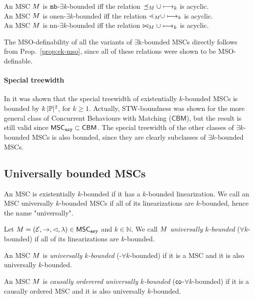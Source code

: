\begin{proposition}\label{prop:ek-mso}
	An MSC $M$ is $\mathtt{mb}$-$\exists k$-bounded iff the relation $\preceq_M \cup \longmapsto_k$ is acyclic.\\
	An MSC $M$ is onen-$\exists k$-bounded iff the relation $\lessdot_M \cup \longmapsto_k$ is acyclic.\\
	An MSC $M$ is nn-$\exists k$-bounded iff the relation $\bowtie_M \cup \longmapsto_k$ is acyclic.
\end{proposition}

The MSO-definability of all the variants of $\exists$k-bounded MSCs directly follows from Prop.~\ref{prop:ek-mso}, since all of these relations were shown to be MSO-definable.

\paragraph*{Special treewidth}

In \cite[Lemma 5.37]{DBLP:journals/corr/abs-1904-06942} it was shown that the special treewidth of existentially $k$-bounded MSCs is bounded by $k\,|\mathbb{P}|^2$, for $k \ge 1$. Actually, STW-boundness was shown for the more general class of Concurrent Behaviours with Matching ($\mathsf{CBM}$), but the result is still valid since $\mathsf{MSC}_{\mathtt{asy}} \subset \mathsf{CBM}$. The special treewidth of the other classes of $\exists k$-bounded MSCs is also bounded, since they are clearly subclasses of $\exists k$-bounded MSCs.

\subsection{Universally bounded MSCs}

An MSC is existentially $k$-bounded if it has a $k$-bounded linearization. We call an MSC universally $k$-bounded MSCs if all of its linearizations are $k$-bounded, hence the name "universally".

\begin{definition}\label{def:uk_bounded_msc}
	Let $M = (\mathcal{E}, \rightarrow, \lhd, \lambda) \in \mathsf{MSC}_{\mathtt{asy}}$ and $k \in \mathbb{N}$. We call $M$ \emph{universally $k$-bounded} ($\forall k$-bounded) if all of its linearizations are $k$-bounded.
\end{definition}
\begin{definition}
	An MSC $M$ is \emph{\pp universally $k$-bounded} (\pp-$\forall k$-bounded) if it is a \pp MSC and it is also universally $k$-bounded.
\end{definition}
\begin{definition}
	An MSC $M$ is \emph{causally orderered universally $k$-bounded} ($\mathsf{co}$-$\forall k$-bounded) if it is a causally ordered MSC and it is also universally $k$-bounded.
\end{definition}

